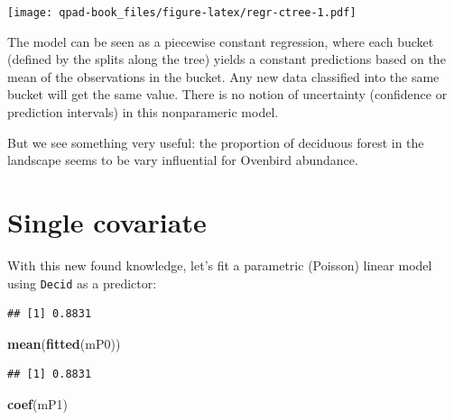 \documentclass[12pt,]{book}
\newenvironment{Shaded}{\begin{snugshade}}{\end{snugshade}}
\newcommand{\DataTypeTok}[1]{\textcolor[rgb]{0.13,0.29,0.53}{#1}}
\newcommand{\KeywordTok}[1]{\textcolor[rgb]{0.13,0.29,0.53}{\textbf{#1}}}
\newcommand{\NormalTok}[1]{#1}
\newcommand{\OperatorTok}[1]{\textcolor[rgb]{0.81,0.36,0.00}{\textbf{#1}}}
\newcommand{\StringTok}[1]{\textcolor[rgb]{0.31,0.60,0.02}{#1}}
\begin{document}
\texttt{[image: qpad-book\_files/figure-latex/regr-ctree-1.pdf]}

The model can be seen as a piecewise constant regression, where each bucket (defined by
the splits along the tree) yields a constant predictions based on the mean of the
observations in the bucket. Any new data classified
into the same bucket will get the same value. There is no notion of uncertainty
(confidence or prediction intervals) in this nonparameric model.

But we see something very useful: the proportion of deciduous forest in the landscape
seems to be vary influential for Ovenbird abundance.

\hypertarget{single-covariate}{%
\section{Single covariate}\label{single-covariate}}

With this new found knowledge, let's fit a parametric (Poisson) linear model
using \texttt{Decid} as a predictor:

\begin{Shaded}
\end{Shaded}

\begin{verbatim}
## [1] 0.8831
\end{verbatim}

\begin{Shaded}
\begin{Highlighting}[]
\KeywordTok{mean}\NormalTok{(}\KeywordTok{fitted}\NormalTok{(mP0))}
\end{Highlighting}
\end{Shaded}

\begin{verbatim}
## [1] 0.8831
\end{verbatim}

\begin{Shaded}
\begin{Highlighting}[]
\KeywordTok{coef}\NormalTok{(mP1)}
\end{Highlighting}
\end{Shaded}
\end{document}
